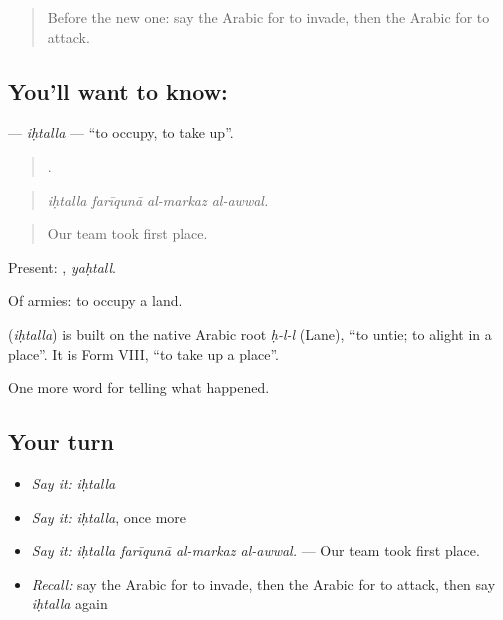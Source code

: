 \label{lesson:AR-C339-ihtalla}



\begin{quote}
Before the new one: say the Arabic for to invade, then the Arabic for to attack.
\end{quote}

\subsection*{You'll want to know: }
\textbf{} — \emph{iḥtalla} — \textquotedblleft{}to occupy, to take up\textquotedblright{}.

\begin{quote}
   .
\end{quote}

\begin{quote}
\emph{iḥtalla farīqunā al-markaz al-awwal.}
\end{quote}

\begin{quote}
Our team took first place.
\end{quote}

Present: , \emph{yaḥtall}.

Of armies: to occupy a land.

\begin{cousinweb}
\textbf{} (\emph{iḥtalla}) is built on the native Arabic root \emph{ḥ-l-l} (Lane), \textquotedblleft{}to untie; to alight in a place\textquotedblright{}. It is Form VIII, \textquotedblleft{}to take up a place\textquotedblright{}.
\end{cousinweb}

\begin{grammarlens}[title={What you've built}]
One more word for telling what happened.
\end{grammarlens}

\subsection*{Your turn}
\begin{itemize}
\raggedright
  \item \emph{Say it:} \emph{iḥtalla}
  \item \emph{Say it:} \emph{iḥtalla}, once more
  \item \emph{Say it:} \emph{iḥtalla farīqunā al-markaz al-awwal.} — Our team took first place.
  \item \emph{Recall:} say the Arabic for to invade, then the Arabic for to attack, then say \emph{iḥtalla} again
\end{itemize}

